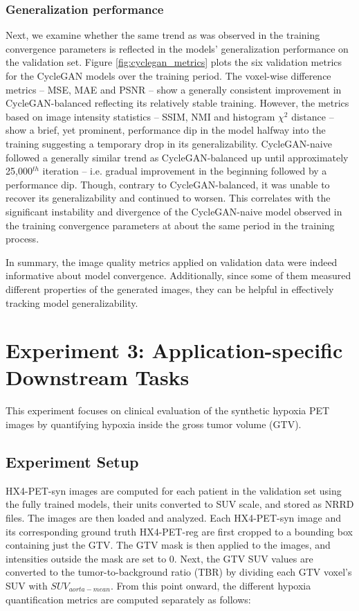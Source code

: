 \subsubsection{Generalization performance} 
Next, we examine whether the same trend as was observed in the training convergence parameters is reflected in the models' generalization performance on the validation set. Figure \ref{fig:cyclegan_metrics} plots the six validation metrics for the CycleGAN models over the training period. The voxel-wise difference metrics -- MSE, MAE and PSNR -- show a generally consistent improvement in CycleGAN-balanced reflecting its relatively stable training. However, the metrics based on image intensity statistics -- SSIM, NMI and histogram $\chi^2$ distance -- show a brief, yet prominent, performance dip in the model halfway into the training suggesting a temporary drop in its generalizability. CycleGAN-naive followed a generally similar trend as CycleGAN-balanced up until approximately 25,000$^{th}$ iteration -- i.e. gradual improvement in the beginning followed by a performance dip. Though, contrary to CycleGAN-balanced, it was unable to recover its generalizability and continued to worsen. This correlates with the significant instability and divergence of the CycleGAN-naive model observed in the training convergence parameters at about the same period in the training process.

In summary, the image quality metrics applied on validation data were indeed informative about model convergence. Additionally, since some of them measured different properties of the generated images, they can be helpful in effectively tracking model generalizability.



\section{Experiment 3: Application-specific Downstream Tasks}
\label{Expt_3}
This experiment focuses on clinical evaluation of the synthetic hypoxia PET images by quantifying hypoxia inside the gross tumor volume (GTV).


\subsection{Experiment Setup}
HX4-PET-syn images are computed for each patient in the validation set using the fully trained models, their units converted to SUV scale, and stored as NRRD files. The images are then loaded and analyzed. Each HX4-PET-syn image and its corresponding ground truth HX4-PET-reg are first cropped to a bounding box containing just the GTV. The GTV mask is then applied to the images, and intensities outside the mask are set to 0. Next, the GTV SUV values are converted to the tumor-to-background ratio (TBR) by dividing each GTV voxel's SUV with $SUV_{aorta-mean}$. From this point onward, the different hypoxia quantification metrics are computed separately as follows:

